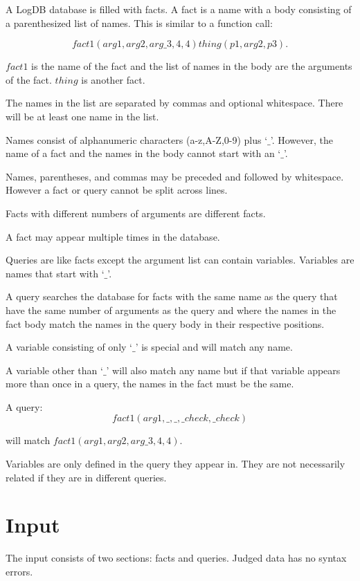 
A LogDB database is filled with facts. A fact is a name with a
body consisting of a
parenthesized list of names. This is  similar to a function call: 

\[
fact1(arg1, arg2 ,arg\_3,4,4) thing(p1,arg2,p3).
\]

$fact1$ is the name of the fact and the list of names in the body are
the arguments of the fact. $thing$ is another fact.

The names in the list are separated by commas and optional
whitespace. There will be at least one name in the list.

Names consist of alphanumeric characters
(a-z,A-Z,0-9) plus `$\_$'. However, the name
of a fact and the names in the body cannot start with an `$\_$'.

Names, parentheses, and commas may be preceded and followed by
whitespace. However a fact or query cannot be split across lines.

Facts with different numbers of arguments are different facts.

A fact may appear multiple times in the database.

Queries are like facts except the argument list can contain 
variables. Variables are names that start with `$\_$'.  

A query searches the database for facts with the same name as the
query that have the same number of arguments as the query and where the
names in the fact body match the names in the query body in their
respective positions.

A variable consisting of only `$\_$' is special and will match any
name.

A variable other than `$\_$' will also match any name but if that variable
appears more than once in a query, the names in the fact must be the same.

A query:
\[
fact1(arg1,\_,\_,\_check,\_check)
\]

will match $fact1(arg1, arg2 ,arg\_3,4,4)$.

Variables are only defined in the query they appear in. They are not
necessarily related if they are in different queries.

\section*{Input}

The input consists of two sections: facts and queries. Judged data has
no syntax errors.

